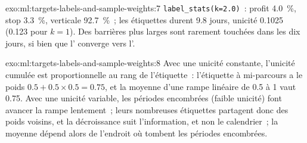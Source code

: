 \begin{solution}{exo:ml:targets-labels-and-sample-weights:7}
\texttt{label\_stats(k=2.0)}~: profit 4.0~\%, stop 3.3~\%, verticale 92.7~\%~; les étiquettes durent 9.8 jours, unicité 0.1025
(0.123 pour $k = 1$). Des barrières plus larges sont rarement touchées dans les dix jours, si bien que l' converge vers
l'.
\end{solution}

\begin{solution}{exo:ml:targets-labels-and-sample-weights:8}
Avec une unicité constante, l'unicité cumulée est proportionnelle au rang de l'étiquette~: l'étiquette à mi-parcours a le poids
$0.5 + 0.5\times0.5 = 0.75$, et la moyenne d'une rampe linéaire de 0.5 à 1 vaut 0.75. Avec une unicité variable, les périodes encombrées
(faible unicité) font avancer la rampe lentement~; leurs nombreuses étiquettes partagent donc des poids voisins, et la décroissance suit
l'information, et non le calendrier~; la moyenne dépend alors de l'endroit où tombent les périodes encombrées.
\end{solution}


